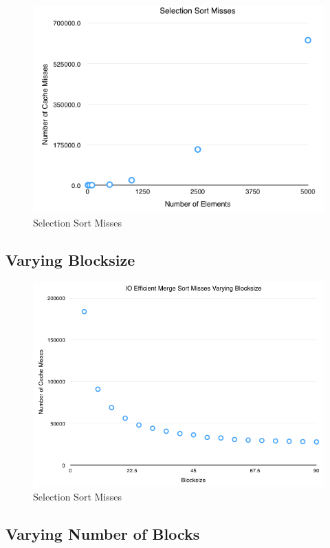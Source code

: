 \documentclass[11pt]{article}
\begin{document}
\begin{figure}[H]  
\includegraphics[scale=0.6]{figures/SelectionSortMisses.png}
\caption{Selection Sort Misses}
\label{listrankingio}
\end{figure}

\subsection{Varying Blocksize}

\begin{figure}[H]  
\includegraphics[scale=0.45]{figures/Blocksize_IOEfficientMergeSort.png}
\caption{Selection Sort Misses}
\label{listrankingio}
\end{figure}

\subsection{Varying Number of Blocks}
\end{document}
